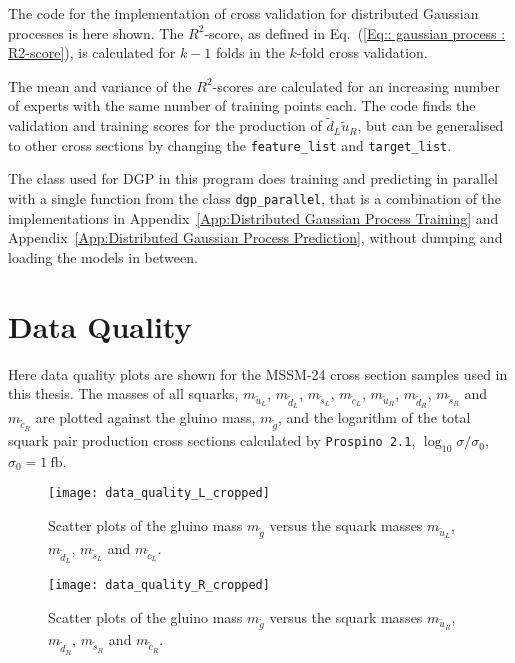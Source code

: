\documentclass[twoside,english]{uiofysmaster}
\begin{document}
{{\begin{appendices}
The code for the implementation of cross validation for distributed Gaussian processes is here shown. The $R^2$-score, as defined in Eq.~(\ref{Eq:: gaussian process : R2-score}), is calculated for $k-1$ folds in the $k$-fold cross validation.

 The mean and variance of the $R^2$-scores are calculated for an increasing number of experts with the same number of training points each. The code finds the validation and training scores for the production of $\widetilde{d}_L \widetilde{u}_R$, but can be generalised to other cross sections by changing the \verb|feature_list| and \verb|target_list|.

The class used for DGP in this program does training and predicting in parallel with a single function from the class \verb|dgp_parallel|, that is a combination of the implementations in Appendix~\ref{App:Distributed Gaussian Process Training} and Appendix~\ref{App:Distributed Gaussian Process Prediction}, without dumping and loading the models in between.




 
\chapter{Data Quality}\label{App: Quality Plots}



Here data quality plots are shown for the MSSM-24 cross section samples used in this thesis. The masses of all squarks, $m_{\widetilde{u}_L}$, $m_{\widetilde{d}_L}$, $m_{\widetilde{s}_L}$, $m_{\widetilde{c}_L}$, $m_{\widetilde{u}_R}$, $m_{\widetilde{d}_R}$, $m_{\widetilde{s}_R}$ and $m_{\widetilde{c}_R}$ are plotted against the gluino mass, $m_{\tilde{g}}$, and the logarithm of the total squark pair production cross sections calculated by \verb|Prospino 2.1|, $\log_{10} \sigma / \sigma_0$, $\sigma_0 = 1~\mathrm{fb}$.


\begin{figure}[H]
    \centering
        \texttt{[image: data\_quality\_L\_cropped]}
    \caption{Scatter plots of the gluino mass $m_{\tilde{g}}$ versus the squark masses $m_{\widetilde{u}_L}$, $m_{\widetilde{d}_L}$, $m_{\widetilde{s}_L}$ and $m_{\widetilde{c}_L}$.}
\label{Fig:: App : Data quality plots}
\end{figure}

\begin{figure}[H]
    \centering
        \texttt{[image: data\_quality\_R\_cropped]}
    \caption{Scatter plots of the gluino mass $m_{\tilde{g}}$ versus the squark masses $m_{\widetilde{u}_R}$, $m_{\widetilde{d}_R}$, $m_{\widetilde{s}_R}$ and $m_{\widetilde{c}_R}$.}
\label{Fig:: App : Data quality plots}
\end{figure}


\end{appendices}}}
\end{document}
